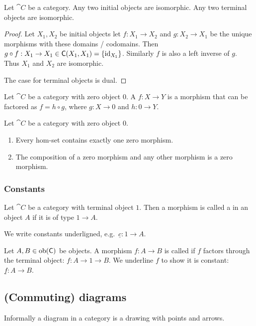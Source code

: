 \begin{proposition}
Let $\cat{C}$ be a category. Any two initial objects are isomorphic. Any two terminal objects are isomorphic.
\end{proposition}
\begin{proof}
Let $X_1,X_2$ be initial objects let $f:X_1\to X_2$ and $g:X_2\to X_1$ be the unique morphisms with these domains / codomains. Then $g\circ f: X_1 \to X_1 \in \mathsf{C}(X_1, X_1) = \{\operatorname{id}_{X_1}\}$. Similarly $f$ is also a left inverse of $g$. Thus $X_1$ and $X_2$ are isomorphic.

The case for terminal objects is dual.
\end{proof}

\begin{definition}
Let $\cat{C}$ be a category with zero object $0$. A  $f: X\to Y$ is a morphism that can be factored as $f = h\circ g$, where $g: X\to 0$ and $h: 0\to Y$.
\end{definition}

\begin{proposition}
Let $\cat{C}$ be a category with zero object $0$.
\begin{enumerate}
\item Every hom-set contains exactly one zero morphism.
\item The composition of a zero morphism and any other morphism is a zero morphism.
\end{enumerate}
\end{proposition}

\subsubsection{Constants}
\begin{definition}
Let $\cat{C}$ be a category with terminal object $1$. Then a morphism is called a  in an object $A$ if it is of type $1 \to A$.

We write constants underligned, e.g.\ $\underline{c}: 1\to A$.

Let $A,B\in\operatorname{ob}(\mathsf{C})$ be objects. A morphism $f: A\to B$ is called  if $f$ factors through the terminal object: $f: A \to 1 \to B$. We underline $f$ to show it is constant: $\underline{f}: A\to B$.
\end{definition}

\subsection{(Commuting) diagrams}
Informally a diagram in a category is a drawing with points and arrows.

